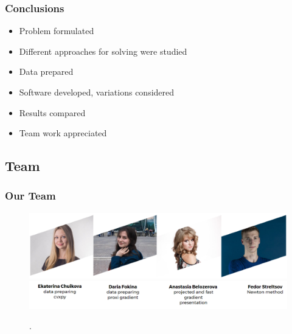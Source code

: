 \documentclass[hyperref={pdfpagelabels=false}]{beamer}
\begin{document}
\begin{frame}
\frametitle{Conclusions}

\begin{itemize}
\item Problem formulated 
\item Different approaches for solving were studied
\item Data prepared
\item Software developed, variations considered
\item Results compared
\item Team work appreciated
\end{itemize}

\end{frame}

\subsection{Team}
\begin{frame}
\frametitle{Our Team}

\begin{figure}[h]
\begin{adjustwidth}{-1.1cm}{-0.9 cm}
\includegraphics[scale=0.38]{Team.png}\\
\includegraphics[scale=0.35]{signs.png}
\end{adjustwidth}
\caption{.}
\end{figure}

\end{frame}
\end{document}
